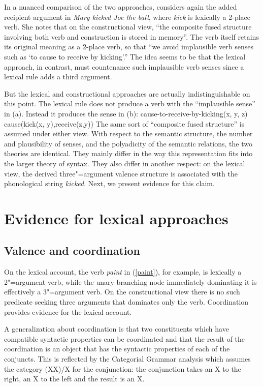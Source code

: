 \addlines[2]
In a nuanced comparison of the two approaches, \citet[--140]{Goldberg95a}
considers again the added recipient argument in \emph{Mary kicked Joe the ball}, where \emph{kick}
is lexically a 2-place verb.  She notes that on the constructional view, ``the composite fused
structure involving both verb and construction is stored in memory''.  
The verb itself retains its original meaning as a 2-place verb, so that ``we
avoid implausible verb senses such as `to cause to receive by kicking'.''  The idea seems to be that
the lexical approach, in contrast, must countenance such implausible verb senses since a lexical
rule adds a third argument.  

But the lexical and constructional approaches are actually indistinguishable on this point.  The lexical rule does not
produce a verb with the ``implausible sense'' in (a).  Instead it produces the sense in (b):
\eal
\ex cause-to-receive-by-kicking(x, y, z) 
\ex cause(kick(x, y),receive(z,y))
\zl
The same sort of ``composite fused structure'' is assumed under either view.  
With respect to the semantic structure, the number and plausibility of senses, and the polyadicity of the semantic relations, the two
theories are identical.  They mainly differ in the way this representation fits into the larger theory of syntax.  
They also differ in another respect: on the lexical view, the derived three"=argument valence
structure is associated with the phonological string
\emph{kicked}.  Next, we present evidence for this claim.
 

\section{Evidence for lexical approaches}

\subsection{Valence and coordination}
\label{coordination-sec}

On the lexical account, the verb \emph{paint} in (\ref{paint}), for example, is lexically a
2"=argument verb, while the unary branching node immediately dominating it is effectively a
3"=argument verb.  On the constructional view there is no such   predicate seeking three arguments
that dominates only the verb.  Coordination provides evidence for the lexical account.   

A generalization about coordination is that two constituents which have compatible syntactic
properties can be coordinated and that the result of the coordination is an object that has the
syntactic properties of each of the conjuncts. This is reflected by the
Categorial Grammar analysis which assumes the category (X\bs X)/X for the conjunction: the
conjunction takes an X to the right, an X to the left and the result is an X.


